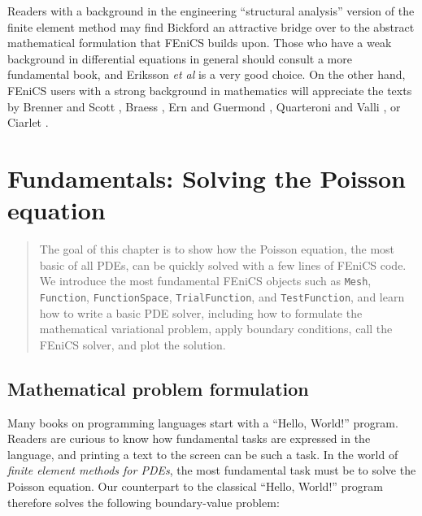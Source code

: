 \documentclass[graybox,envcountchap,sectrefs,final]{svmonodo}
\begin{document}
Readers with a background in the engineering ``structural analysis''
version of the finite element method may find Bickford
\cite{Bickford1994} an attractive bridge over to the abstract
mathematical formulation that FEniCS builds upon. Those who have a
weak background in differential equations in general should consult a
more fundamental book, and Eriksson \emph{et al}
\cite{ErikssonEstepHansboEtAl1996} is a very good choice. On the
other hand, FEniCS users with a strong background in mathematics
will appreciate the texts by Brenner and Scott \cite{BrennerScott2008},
Braess \cite{Braess2007}, Ern and Guermond \cite{ErnGuermond2004},
Quarteroni and Valli \cite{QuarteroniValli1994}, or Ciarlet
\cite{Ciarlet2002}.

\chapter{Fundamentals: Solving the Poisson equation}
\label{ch:fundamentals}


\begin{quote}
The goal of this chapter is to show how the Poisson equation, the
most basic of all PDEs, can be quickly solved with a few lines
of FEniCS code. We introduce the most
fundamental FEniCS objects such as \texttt{Mesh}, \texttt{Function},
\texttt{FunctionSpace}, \texttt{TrialFunction},
and \texttt{TestFunction}, and learn how to write a basic PDE solver,
including how to formulate the mathematical variational problem,
apply boundary conditions, call the FEniCS solver, and plot
the solution.
\end{quote}



\section{Mathematical problem formulation}
\label{ftut:poisson1:bvp}

Many books on programming languages start with a ``Hello, World!''
program. Readers are curious to know how fundamental tasks are
expressed in the language, and printing a text to the screen can be
such a task. In the world of \emph{finite element methods for PDEs}, the
most fundamental task must be to solve the Poisson equation. Our
counterpart to the classical ``Hello, World!'' program therefore
solves the following boundary-value problem:
\end{document}
